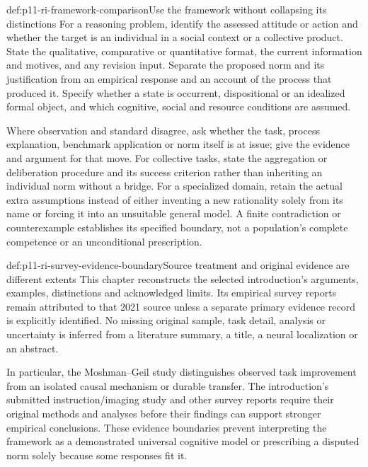 \begin{hbmethod}{def:p11-ri-framework-comparison}{Use the framework without collapsing its distinctions}
For a reasoning problem, identify the assessed attitude or action and
whether the target is an individual in a social context or a collective
product. State the qualitative, comparative or quantitative format,
the current information and motives, and any revision input. Separate
the proposed norm and its justification from an empirical response
and an account of the process that produced it. Specify whether a
state is occurrent, dispositional or an idealized formal object, and
which cognitive, social and resource conditions are assumed.

Where observation and standard disagree, ask whether the task,
process explanation, benchmark application or norm itself is at issue;
give the evidence and argument for that move. For collective tasks,
state the aggregation or deliberation procedure and its success
criterion rather than inheriting an individual norm without a bridge.
For a specialized domain, retain the actual extra assumptions instead
of either inventing a new rationality solely from its name or forcing
it into an unsuitable general model. A finite contradiction or
counterexample establishes its specified boundary, not a population's
complete competence or an unconditional prescription.
\end{hbmethod}

\begin{hbwarning}{def:p11-ri-survey-evidence-boundary}{Source treatment and original evidence are different extents}
This chapter reconstructs the selected introduction's arguments,
examples, distinctions and acknowledged limits. Its empirical survey
reports remain attributed to that 2021 source unless a separate primary
evidence record is explicitly identified. No missing original sample,
task detail, analysis or uncertainty is inferred from a literature
summary, a title, a neural localization or an abstract.

In particular, the Moshman--Geil study distinguishes observed task
improvement from an isolated causal mechanism or durable transfer. The
introduction's submitted instruction/imaging study and other survey
reports require their original methods and analyses before their
findings can support stronger empirical conclusions. These evidence
boundaries prevent interpreting the
framework as a demonstrated universal cognitive model or prescribing
a disputed norm solely because some responses fit it.
\end{hbwarning}
